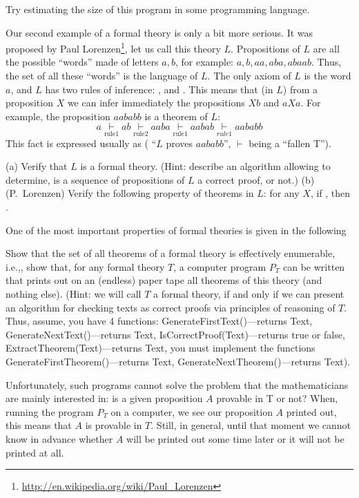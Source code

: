 \begin{exer}
Try estimating the size of this program in some programming language.
\end{exer}

Our second example of a formal theory is only a bit more serious.
It was proposed by Paul Lorenzen\footnote{\url{http://en.wikipedia.org/wiki/Paul\_Lorenzen}}, let us call this theory \(L\).
Propositions of \(L\) are all the possible ``words'' made of letters \(a, b\), for example: \(a, b, aa, aba, abaab\).
Thus, the set of all these ``words'' is the language of \(L\).
The only axiom of \(L\) is the word \(a\), and \(L\) has two rules of inference: , and .
This means that (in \(L\)) from a proposition \(X\) we can infer immediately the propositions \(Xb\) and \(aXa\).
For example, the proposition \(aababb\) is a theorem of \(L\):
\[
a \underset{\text{rule1}}{\vdash} ab \underset{\text{rule2}}{\vdash} aaba \underset{\text{rule1}}{\vdash} aabab \underset{rule1}{\vdash} aababb
\]
This fact is expressed usually as  ( ``\(L\) proves \(aababb\)'', \(\vdash\) being a ``fallen T'').

\begin{exer}
(a) Verify that \(L\) is a formal theory.
(Hint: describe an algorithm allowing to determine, is a sequence of propositions of \(L\) a correct proof, or not.)
(b) (P.~Lorenzen) Verify the following property of theorems in \(L\): for any \(X\), if , then .
\end{exer}

One of the most important properties of formal theories is given in the following

\begin{exer}
Show that the set of all theorems of a formal theory is effectively enumerable, i.e.,, show that, for any formal theory \(T\), a computer program \(P_T\) can be written that prints out on an (endless) paper tape all theorems of this theory (and nothing else).
(Hint: we will call \(T\) a formal theory, if and only if we can present an algorithm for checking texts as correct proofs via principles of reasoning of \(T\).
Thus, assume, you have 4 functions: GenerateFirstText()---returns Text, GenerateNextText()---returns Text, IsCorrectProof(Text)---returns true or false, ExtractTheorem(Text)---returns Text, you must implement the functions GenerateFirstTheorem()---returns Text, GenerateNextTheorem()---returns Text).

Unfortunately, such programs cannot solve the problem that the mathematicians are mainly interested in: is a given proposition \(A\) provable in T or not? When, running the program \(P_T\) on a computer, we see our proposition \(A\) printed out, this means that \(A\) is provable in \(T\).
Still, in general, until that moment we cannot know in advance whether \(A\) will be printed out some time later or it will not be printed at all.
\end{exer}

